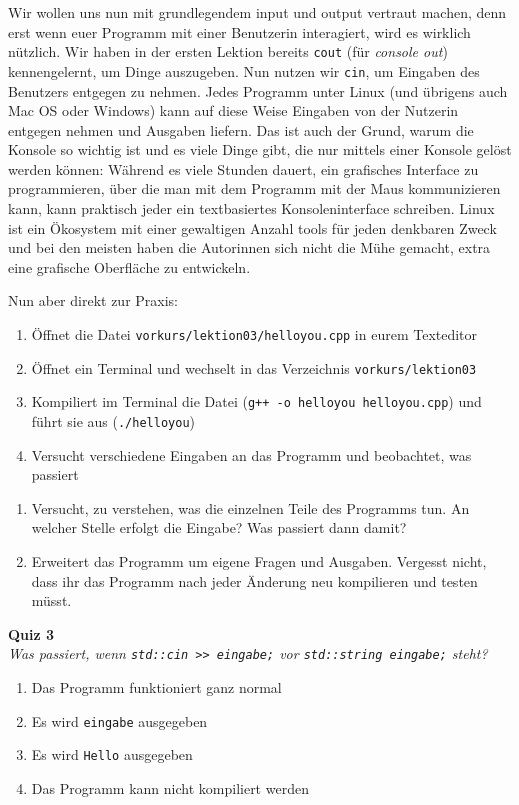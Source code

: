 Wir wollen uns nun mit grundlegendem input und output vertraut machen, denn
erst wenn euer Programm mit einer Benutzerin interagiert, wird es wirklich
nützlich. Wir haben in der ersten Lektion bereits \texttt{cout} (für
\emph{console out}) kennengelernt, um Dinge auszugeben. Nun nutzen wir
\texttt{cin}, um Eingaben des Benutzers entgegen zu nehmen. Jedes Programm
unter Linux (und übrigens auch Mac OS oder Windows) kann auf diese Weise
Eingaben von der Nutzerin entgegen nehmen und Ausgaben liefern. Das ist auch
der Grund, warum die Konsole so wichtig ist und es viele Dinge gibt, die nur
mittels einer Konsole gelöst werden können: Während es viele Stunden dauert,
ein grafisches Interface zu programmieren, über die man mit dem Programm mit
der Maus kommunizieren kann, kann praktisch jeder ein textbasiertes
Konsoleninterface schreiben. Linux ist ein Ökosystem mit einer gewaltigen
Anzahl tools für jeden denkbaren Zweck und bei den meisten haben die Autorinnen
sich nicht die Mühe gemacht, extra eine grafische Oberfläche zu entwickeln.

Nun aber direkt zur Praxis:

\begin{praxis}
    \begin{enumerate}
        \item Öffnet die Datei \texttt{vorkurs/lektion03/helloyou.cpp} in eurem Texteditor
        \item Öffnet ein Terminal und wechselt in das Verzeichnis \texttt{vorkurs/lektion03}
        \item Kompiliert im Terminal die Datei (\texttt{g++ -o helloyou
                  helloyou.cpp}) und führt sie aus (\texttt{./helloyou})
        \item Versucht verschiedene Eingaben an das Programm und beobachtet, was passiert
    \end{enumerate}

\end{praxis}

\begin{spiel}
\begin{enumerate}
    \item Versucht, zu verstehen, was die einzelnen Teile des Programms tun. An
        welcher Stelle erfolgt die Eingabe? Was passiert dann damit?
    \item Erweitert das Programm um eigene Fragen und Ausgaben. Vergesst nicht,
        dass ihr das Programm nach jeder Änderung neu kompilieren und testen
        müsst.
\end{enumerate}
\end{spiel}

\textbf{Quiz 3}\\
\textit{Was passiert, wenn \texttt{std::cin >> eingabe;} vor \texttt{std::string eingabe;} steht?}
\begin{enumerate}[label=\alph*)]
    \item Das Programm funktioniert ganz normal
    \item Es wird \texttt{eingabe} ausgegeben
    \item Es wird \texttt{Hello} ausgegeben
    \item Das Programm kann nicht kompiliert werden
\end{enumerate}
